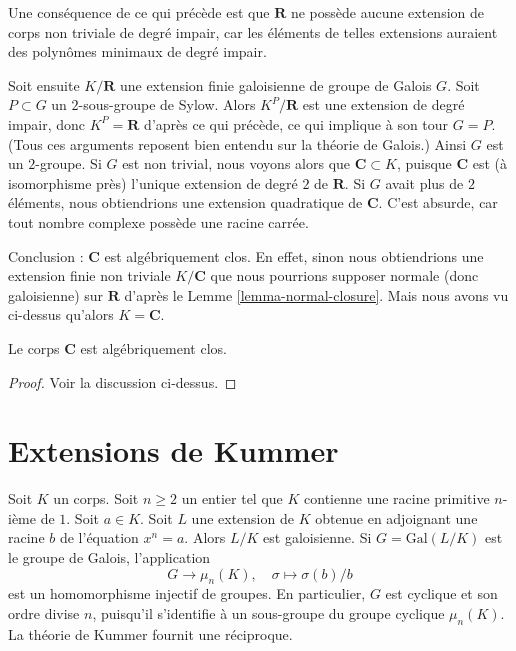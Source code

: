 \medskip\noindent
Une conséquence de ce qui précède est que $\mathbf{R}$ ne possède
aucune extension de corps non triviale de degré impair, car les éléments de telles extensions
auraient des polynômes minimaux de degré impair.

\medskip\noindent
Soit ensuite $K/\mathbf{R}$ une extension finie galoisienne de groupe de Galois $G$.
Soit $P \subset G$ un $2$-sous-groupe de Sylow. Alors $K^P/\mathbf{R}$ est une
extension de degré impair, donc $K^P = \mathbf{R}$ d'après ce qui précède,
ce qui implique à son tour
$G = P$. (Tous ces arguments reposent bien entendu sur la théorie de Galois.)
Ainsi $G$ est un $2$-groupe. Si $G$ est non trivial, nous voyons alors que
$\mathbf{C} \subset K$, puisque $\mathbf{C}$ est (à isomorphisme près) l'unique
extension de degré $2$ de $\mathbf{R}$. Si $G$ avait plus de $2$ éléments,
nous obtiendrions une extension quadratique de $\mathbf{C}$.
C'est absurde, car tout nombre complexe possède une racine carrée.

\medskip\noindent
Conclusion : $\mathbf{C}$ est algébriquement clos. En effet, sinon
nous obtiendrions une extension finie non triviale $K/\mathbf{C}$
que nous pourrions supposer normale (donc galoisienne) sur $\mathbf{R}$ d'après le
Lemme \ref{lemma-normal-closure}. Mais nous avons vu ci-dessus qu'alors
$K = \mathbf{C}$.

\begin{lemma}
\label{lemma-C-algebraically-closed}
Le corps $\mathbf{C}$ est algébriquement clos.
\end{lemma}

\begin{proof}
Voir la discussion ci-dessus.
\end{proof}





\section{Extensions de Kummer}
\label{section-Kummer}

\noindent
Soit $K$ un corps. Soit $n \geq 2$ un entier tel que $K$ contienne
une racine primitive $n$-ième de $1$. Soit $a \in K$. Soit $L$ une extension
de $K$ obtenue en adjoignant une racine $b$ de l'équation $x^n = a$.
Alors $L/K$ est galoisienne. Si $G = \text{Gal}(L/K)$ est le groupe de Galois,
l'application
$$
G \longrightarrow \mu_n(K),\quad \sigma \longmapsto \sigma(b)/b
$$
est un homomorphisme injectif de groupes. En particulier, $G$ est cyclique
et son ordre divise $n$, puisqu'il s'identifie à un sous-groupe du groupe cyclique $\mu_n(K)$.
La théorie de Kummer fournit une réciproque.

